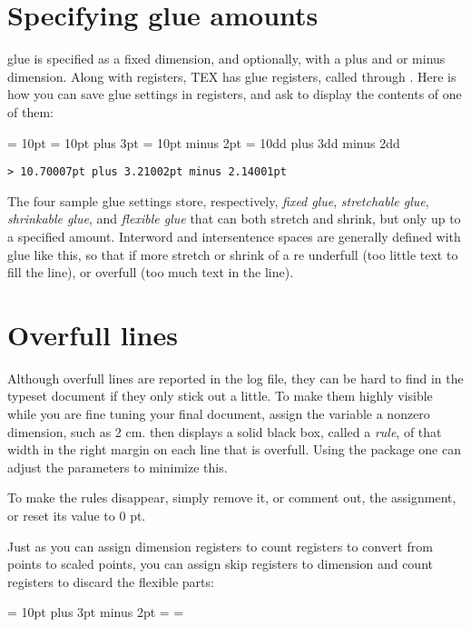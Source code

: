 \section{Specifying glue amounts}

\tex glue is specified as a fixed dimension, and optionally, with a plus and
or minus dimension. Along with  registers, TEX has glue registers,
called  through . Here is how you can save glue settings in
\tex registers, and ask \tex to display the contents of one of them:

\begin{teX}
 = 10pt
 = 10pt plus 3pt
 = 10pt minus 2pt
 = 10dd plus 3dd minus 2dd
\the {}
\end{teX}


\texttt{> 10.70007pt plus 3.21002pt minus 2.14001pt}

The four sample glue settings store, respectively, {\em fixed glue}, {\em  stretchable
glue}, {\em shrinkable glue}, and {\em flexible glue}  that can both stretch and shrink,
but only up to a specified amount. Interword and intersentence spaces are
generally defined with glue like this, so that if more stretch or shrink of  a
re underfull (too little text to fill the line), or overfull (too much text in the
line).


\section{Overfull lines}

Although overfull lines are reported in the \tex log file, they can be hard
to find in the typeset document if they only stick out a little. To make
them highly visible while you are fine tuning your final document, assign
the variable  a nonzero dimension, such as 2 cm. \tex then
displays a solid black box, called a \emph{rule}, of that width in the right margin
on each line that is overfull. Using the  package one can adjust the parameters to minimize this.

To make the rules disappear, simply remove it,
or comment out, the assignment, or reset its value to 0 pt. 

Just as you can assign dimension registers to count registers to convert
from points to scaled points, you can assign skip registers to dimension and
count registers to discard the flexible parts:


\begin{teX}
 = 10pt plus 3pt minus 2pt
\the{}
  = 
\the {}
 = 
\the {}
\end{teX}




